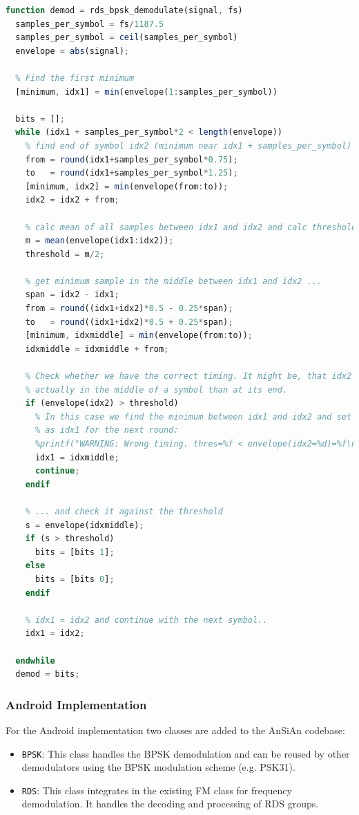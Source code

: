 \begin{lstlisting}[label=lst:octave_rds_bpsk, caption=Octave implementation of the BPSK demodulation, language=octave]
function demod = rds_bpsk_demodulate(signal, fs)
  samples_per_symbol = fs/1187.5
  samples_per_symbol = ceil(samples_per_symbol)
  envelope = abs(signal);
  
  % Find the first minimum
  [minimum, idx1] = min(envelope(1:samples_per_symbol))
  
  bits = [];
  while (idx1 + samples_per_symbol*2 < length(envelope))
    % find end of symbol idx2 (minimum near idx1 + samples_per_symbol)
    from = round(idx1+samples_per_symbol*0.75);
    to   = round(idx1+samples_per_symbol*1.25);
    [minimum, idx2] = min(envelope(from:to));
    idx2 = idx2 + from;
    
    % calc mean of all samples between idx1 and idx2 and calc threshold = mean/2
    m = mean(envelope(idx1:idx2));
    threshold = m/2;
    
    % get minimum sample in the middle between idx1 and idx2 ...
    span = idx2 - idx1;
    from = round((idx1+idx2)*0.5 - 0.25*span);
    to   = round((idx1+idx2)*0.5 + 0.25*span);
    [minimum, idxmiddle] = min(envelope(from:to));
    idxmiddle = idxmiddle + from;
    
    % Check whether we have the correct timing. It might be, that idx2 is
    % actually in the middle of a symbol than at its end.
    if (envelope(idx2) > threshold)
      % In this case we find the minimum between idx1 and idx2 and set it
      % as idx1 for the next round:
      %printf("WARNING: Wrong timing. thres=%f < envelope(idx2=%d)=%f\n",threshold,idx2,envelope(idx2));
      idx1 = idxmiddle;
      continue;
    endif
    
    % ... and check it against the threshold
    s = envelope(idxmiddle);
    if (s > threshold)
      bits = [bits 1];
    else
      bits = [bits 0];
    endif
    
    % idx1 = idx2 and continue with the next symbol..
    idx1 = idx2;
    
  endwhile
  demod = bits;
\end{lstlisting}


\subsubsection{Android Implementation}

For the Android implementation two classes are added to the AnSiAn codebase:
\begin{itemize}
	\item \texttt{BPSK}: This class handles the \ac{BPSK} demodulation and can be
		reused by other demodulators using the \ac{BPSK} modulation scheme
		(e.g. PSK31).
	\item \texttt{RDS}: This class integrates in the existing FM class for frequency
		demodulation. It handles the decoding and processing of \ac{RDS}
		groups. 
\end{itemize}

